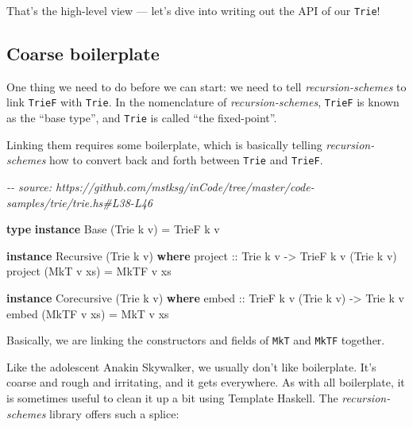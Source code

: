 \documentclass[]{article}
\newenvironment{Shaded}{}{}
\newcommand{\CommentTok}[1]{\textcolor[rgb]{0.38,0.63,0.69}{\textit{#1}}}
\newcommand{\DataTypeTok}[1]{\textcolor[rgb]{0.56,0.13,0.00}{#1}}
\newcommand{\KeywordTok}[1]{\textcolor[rgb]{0.00,0.44,0.13}{\textbf{#1}}}
\newcommand{\NormalTok}[1]{#1}
\newcommand{\OtherTok}[1]{\textcolor[rgb]{0.00,0.44,0.13}{#1}}
\begin{document}
That's the high-level view --- let's dive into writing out the API of our
\texttt{Trie}!

\subsection{Coarse boilerplate}\label{coarse-boilerplate}

One thing we need to do before we can start: we need to tell
\emph{recursion-schemes} to link \texttt{TrieF} with \texttt{Trie}. In the
nomenclature of \emph{recursion-schemes}, \texttt{TrieF} is known as the ``base
type'', and \texttt{Trie} is called ``the fixed-point''.

Linking them requires some boilerplate, which is basically telling
\emph{recursion-schemes} how to convert back and forth between \texttt{Trie} and
\texttt{TrieF}.

\begin{Shaded}
\begin{Highlighting}[]
\CommentTok{{-}{-} source: https://github.com/mstksg/inCode/tree/master/code{-}samples/trie/trie.hs\#L38{-}L46}

\KeywordTok{type} \KeywordTok{instance} \DataTypeTok{Base}\NormalTok{ (}\DataTypeTok{Trie}\NormalTok{ k v) }\OtherTok{=} \DataTypeTok{TrieF}\NormalTok{ k v}

\KeywordTok{instance} \DataTypeTok{Recursive}\NormalTok{ (}\DataTypeTok{Trie}\NormalTok{ k v) }\KeywordTok{where}
\OtherTok{    project ::} \DataTypeTok{Trie}\NormalTok{ k v }\OtherTok{{-}\textgreater{}} \DataTypeTok{TrieF}\NormalTok{ k v (}\DataTypeTok{Trie}\NormalTok{ k v)}
\NormalTok{    project (}\DataTypeTok{MkT}\NormalTok{ v xs) }\OtherTok{=} \DataTypeTok{MkTF}\NormalTok{ v xs}

\KeywordTok{instance} \DataTypeTok{Corecursive}\NormalTok{ (}\DataTypeTok{Trie}\NormalTok{ k v) }\KeywordTok{where}
\OtherTok{    embed ::} \DataTypeTok{TrieF}\NormalTok{ k v (}\DataTypeTok{Trie}\NormalTok{ k v) }\OtherTok{{-}\textgreater{}} \DataTypeTok{Trie}\NormalTok{ k v}
\NormalTok{    embed (}\DataTypeTok{MkTF}\NormalTok{ v xs) }\OtherTok{=} \DataTypeTok{MkT}\NormalTok{ v xs}
\end{Highlighting}
\end{Shaded}

Basically, we are linking the constructors and fields of \texttt{MkT} and
\texttt{MkTF} together.

Like the adolescent Anakin Skywalker, we usually don't like boilerplate. It's
coarse and rough and irritating, and it gets everywhere. As with all
boilerplate, it is sometimes useful to clean it up a bit using Template Haskell.
The \emph{recursion-schemes} library offers such a splice:
\end{document}
